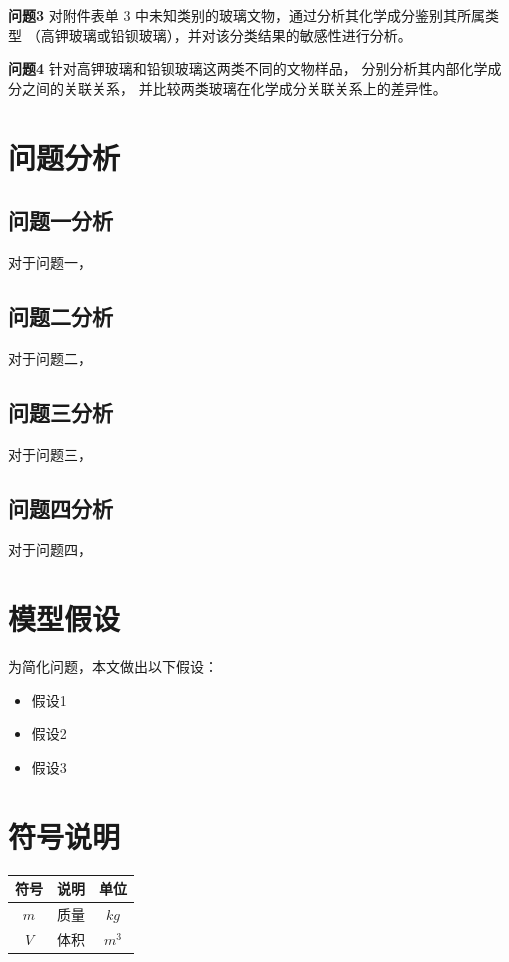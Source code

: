\documentclass[withoutpreface,bwprint]{cumcmthesis}
\begin{document}
\textbf{问题3} 
对附件表单 3 中未知类别的玻璃文物，通过分析其化学成分鉴别其所属类型
（高钾玻璃或铅钡玻璃），并对该分类结果的敏感性进行分析。

\textbf{问题4}  
针对高钾玻璃和铅钡玻璃这两类不同的文物样品，
分别分析其内部化学成分之间的关联关系，
并比较两类玻璃在化学成分关联关系上的差异性。

\section{问题分析}
\subsection{问题一分析}
对于问题一，

\subsection{问题二分析}	
对于问题二，

\subsection{问题三分析}
对于问题三，

\subsection{问题四分析}
对于问题四，


\section{模型假设}

为简化问题，本文做出以下假设：

\begin{itemize}[itemindent=2em]
\item 假设1
\item 假设2
\item 假设3
\end{itemize}


\section{符号说明}
\begin{table}[H]
\centering
\begin{tabularx}{\textwidth}{CLC}
\toprule
符号    & 说明    & 单位 \\
\midrule
$m     $& 质量 & $kg$ \\
$V     $& 体积 & $m^3$ \\
\bottomrule
\end{tabularx}
\label{tab:符号说明}
\end{table}
\end{document}
